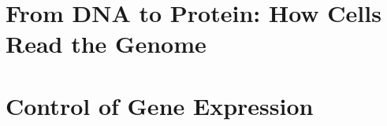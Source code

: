\chapter{From DNA to Protein: How Cells Read the Genome}










\chapter{Control of Gene Expression}

